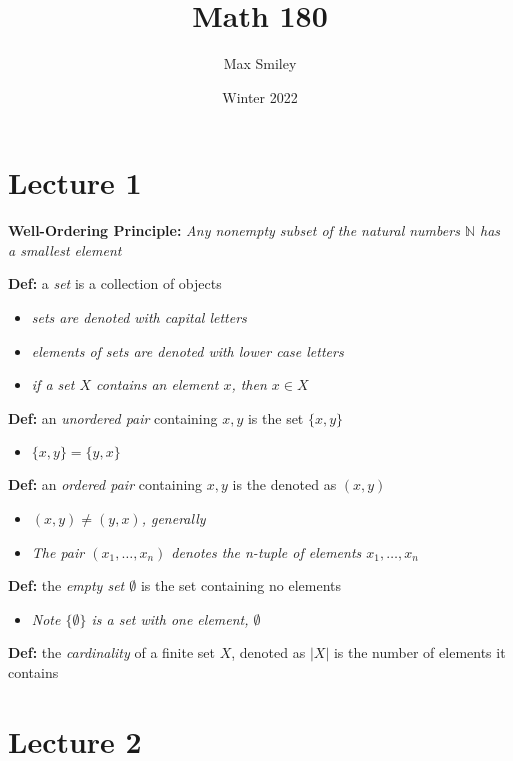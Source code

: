 \documentclass[12pt]{article}
\begin{document}
\title{Math 180}
\author{Max Smiley}
\date{Winter 2022}
\maketitle

\section{Lecture 1}

\textbf{Well-Ordering Principle: }\emph{Any nonempty subset of the natural numbers $\mathbb{N}$ has a smallest element}

\textbf{Def: }a \emph{set} is a collection of objects
\begin{itemize}
    \item \emph{sets are denoted with capital letters}
    \item \emph{elements of sets are denoted with lower case letters}
    \item \emph{if a set $X$ contains an element $x$, then $x \in X$}
\end{itemize}

\textbf{Def: }an \emph{unordered pair} containing $x, y$ is the set $\{x, y \}$
\begin{itemize}
    \item $\{x, y\} = \{y, x\}$
\end{itemize}

\textbf{Def: }an \emph{ordered pair} containing $x, y$ is the denoted as $(x, y)$
\begin{itemize}
    \item \emph{$(x, y) \neq (y, x)$, generally}
    \item \emph{The pair $(x_1, \dots, x_n)$ denotes the n-tuple of elements $x_1, \dots, x_n$}
\end{itemize}

\textbf{Def: }the \emph{empty set $\emptyset$} is the set containing no elements
\begin{itemize}
    \item \emph{Note $\{\emptyset\}$ is a set with one element, $\emptyset$}
\end{itemize}

\textbf{Def: }the \emph{cardinality} of a finite set $X$, denoted as $|X|$ is the number of elements it contains

\clearpage

\section{Lecture 2}
\end{document}

